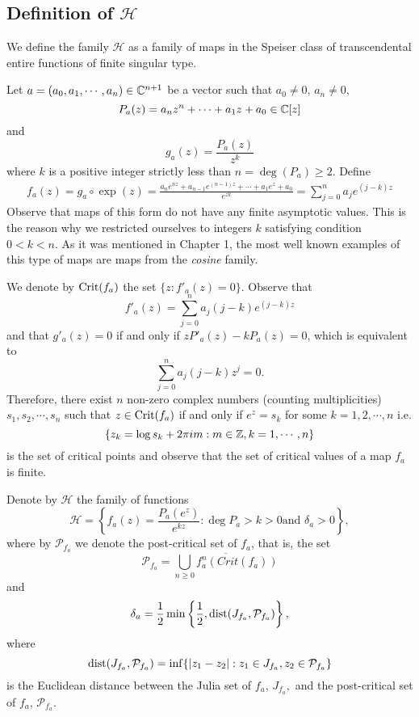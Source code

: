 \subsection{Definition of \texorpdfstring{$\mathcal{H}$}{H}}
\label{subsec:pnk}

We define the family $\mathcal{H}$ as a family of maps in the Speiser class
of transcendental entire functions of finite singular type.

Let $a=(a_0, a_1,\cdots, a_n)\in {\mathbb C}^{n+1}$ be a vector such that $a_0\neq
0$, $a_n \neq 0$,
\[
P_a(z)=a_nz^n+\cdots +a_1z+a_0 \in {\mathbb C}[z]
\]
and
\[
g_a(z)=\frac{P_a(z)}{z^k}
\]
where $k$ is a positive integer strictly less than $n=\deg(P_a)\geq 2$.
Define
\[
\begin{array}{l}
  f_a(z)=g_a\circ \exp(z)
  =\frac{a_ne^{nz}+a_{n-1}e^{(n-1)z}+\cdots
    +a_1e^z+a_0}{e^{zk}}=\sum_{j=0}^{n}a_je^{(j-k)z}
\end{array}
\]
Observe that maps of this form do not have any finite asymptotic values.
This is the reason why we restricted ourselves to integers $k$ satisfying
condition $0<k<n$.  As it was mentioned in Chapter 1, the most well known
examples of this type of maps are maps from the {\em cosine} family.

We denote by  $\textrm{Crit}(f_a)$ the set $\{z:f'_a(z)=0\}$. Observe that
\[f'_a(z)=\sum^n_{j=0}a_j(j-k)e^{(j-k)z}\] and that $g'_a(z)=0$ if and only
if $zP'_a(z)-kP_a(z)=0$, which is equivalent to
\[
\sum_{j=0}^na_j(j-k)z^j=0.
\]
Therefore, there exist $n$ non-zero complex numbers (counting
multiplicities) $s_1, s_2,\cdots, s_n$ such that $z\in \textrm{Crit}(f_a)$ if and
only if $e^z =s_k $ for some $k=1, 2, \cdots, n $ i.e.
\[
\{z_k=\log s_{k}+2\pi im:m\in{\mathbb Z}, k=1,\cdots,n\}
\]
is the set of critical points and observe that the set of critical values of
a map $f_a$ is finite.

Denote by $\mathcal{H}$ the family of functions
\[
\mathcal{H}=\left\{f_a(z)=\frac{P_a(e^z)}{e^{kz}}:\deg P_a > k>0 \textrm{
    and } \delta_a> 0\right\},
\]
where by $\mathcal{P}_{f_a}$ we denote the post-critical set of $f_a$, that
is, the set
\[
\mathcal{P}_{f_a}=\overline{\bigcup_{n\geq 0}f^n_a(Crit(f_a))}
\]
and
\[
\delta_a=\frac{1}{2}\min\left\{\frac{1}{2}, {\mathrm{dist}}(J_{f_a},
  \mathcal{P}_{f_a})\right\},
\]
where
\[
{\mathrm{dist}}(J_{f_a}, \mathcal{P}_{f_a})=\inf\{|z_1-z_2|:z_1\in J_{f_a}, z_2\in
\mathcal{P}_{f_a}\}
\]
is the Euclidean distance between the Julia set of $f_a$, $J_{f_a},$ and the
post-critical set of $f_a$, $\mathcal{P}_{f_a}$.

